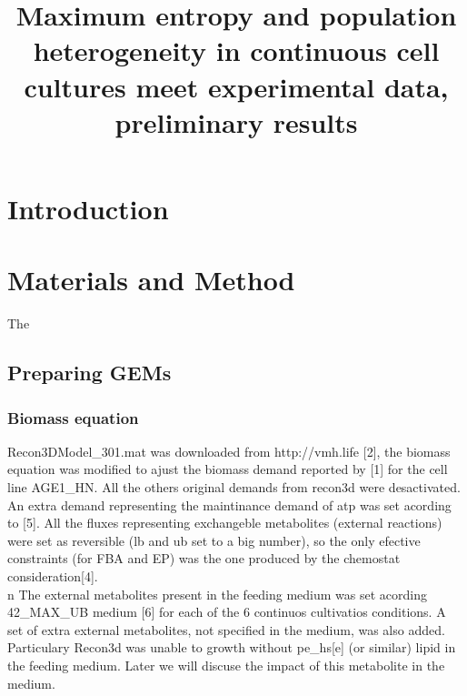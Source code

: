 \documentclass[]{article}
\title{Maximum entropy and population heterogeneity in continuous cell cultures meet experimental data, preliminary results}
\author{}
\begin{document}
\maketitle

\begin{abstract}

\end{abstract}


\section{Introduction}

\section{Materials and Method}

	The 

\subsection{Preparing GEMs}

\subsubsection{Biomass equation}

	Recon3DModel\_301.mat was downloaded from http://vmh.life [2], the biomass equation was modified to ajust the biomass demand reported by [1] for the cell line AGE1\_HN. All the others original demands from recon3d were desactivated. An extra demand representing the maintinance demand of atp was set acording to [5]. All the fluxes representing exchangeble metabolites (external reactions) were set as reversible (lb and ub set to a big number), so the only efective constraints (for FBA and EP) was the one produced by the chemostat consideration[4]. \\n The external metabolites present in the feeding medium was set acording 42\_MAX\_UB medium [6] for each of the 6 continuos cultivatios conditions. A set of extra external metabolites, not specified in the medium, was also added. Particulary Recon3d was unable to growth without pe\_hs[e] (or similar) lipid in the feeding medium. Later we will discuse the impact of this metabolite in the medium.
		
\end{document}

